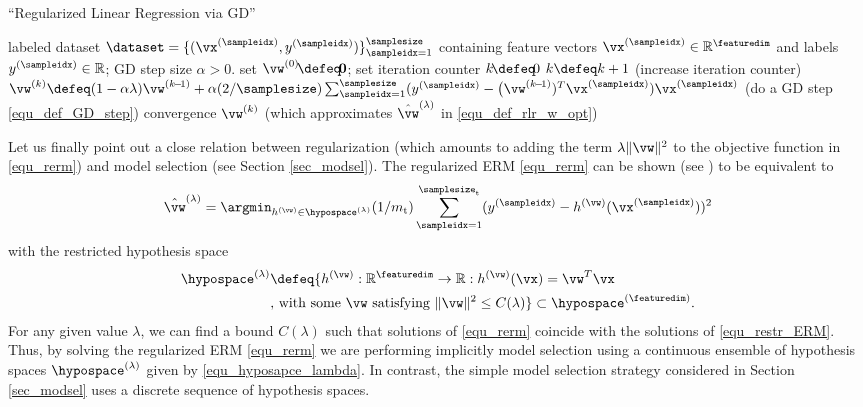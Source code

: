 \documentclass[12pt]{report}
\begin{document}
\begin{algorithm}[htbp]
\caption{``Regularized Linear Regression via GD''}\label{alg:gd_reglinreg}
\begin{algorithmic}[1]
\renewcommand{\algorithmicrequire}{\textbf{Input:}}
\renewcommand{\algorithmicensure}{\textbf{Output:}}
\Require   labeled dataset $\dataset=\{ (\vx^{(\sampleidx)}, y^{(\sampleidx)}) \}_{\sampleidx=1}^{\samplesize}$ containing feature vectors 
$\vx^{(\sampleidx)} \in \mathbb{R}^{\featuredim}$ and labels $y^{(\sampleidx)} \in \mathbb{R}$; GD step size $\alpha >0$. 
\Statex\hspace{-6mm}{\bf Initialize:}set $\vw^{(0)}\!\defeq\!\mathbf{0}$; set iteration counter $k\!\defeq\!0$   
\Repeat 
\State $k \defeq k +1$    (increase iteration counter) 
\State  $\vw^{(k)} \defeq (1- \alpha \lambda) \vw^{(k\!-\!1)} + \alpha (2/\samplesize) \sum_{\sampleidx=1}^{\samplesize} (y^{(\sampleidx)} - \big(\vw^{(k\!-\!1)})^{T} \vx^{(\sampleidx)}) \vx^{(\sampleidx)}$  (do a GD step \eqref{equ_def_GD_step})
\Until convergence 
\Ensure $\vw^{(k)}$ (which approximates $\hat{\vw}^{(\lambda)}$ in \eqref{equ_def_rlr_w_opt})
\end{algorithmic}
\end{algorithm}

Let us finally point out a close relation between regularization (which amounts to 
adding the term $\lambda \| \vw \|^{2}$ to the objective function in \eqref{equ_rerm}) 
and model selection (see Section \ref{sec_modsel}). The regularized ERM \eqref{equ_rerm} 
can be shown (see \cite[Ch. 5]{BertsekasNonLinProgr}) to be equivalent to 
\begin{equation} 
\label{equ_restr_ERM}
\hat{\vw}^{(\lambda)} = \argmin_{h^{(\vw)} \in \hypospace^{(\lambda)}}  (1/m_{\rm t}) \sum_{\sampleidx=1}^{\samplesize_{\rm t}}  (y^{(\sampleidx)} - h^{(\vw)}(\vx^{(\sampleidx)})  )^2
\end{equation}  
with the restricted hypothesis space
\begin{align} 
\label{equ_hyposapce_lambda}
\hypospace^{(\lambda)} & \defeq \{ h^{(\vw)}: \mathbb{R}^{\featuredim} \rightarrow \mathbb{R}: h^{(\vw)}(\vx) = \vw^{T} \vx \nonumber \\
& \mbox{, with some } \vw \mbox{ satisfying } \| \vw \|^{2} \leq C(\lambda) \} \subset \hypospace^{(\featuredim)}. 
\end{align} 
For any given value $\lambda$, we can find a bound $C(\lambda)$ such that 
solutions of \eqref{equ_rerm} coincide with the solutions of \eqref{equ_restr_ERM}. 
Thus, by solving the regularized ERM \eqref{equ_rerm} we are performing implicitly 
model selection using a continuous ensemble of hypothesis spaces $\hypospace^{(\lambda)}$ 
given by \eqref{equ_hyposapce_lambda}. In contrast, the simple model selection strategy 
considered in Section \ref{sec_modsel} uses a discrete sequence of hypothesis spaces.   
\end{document}
